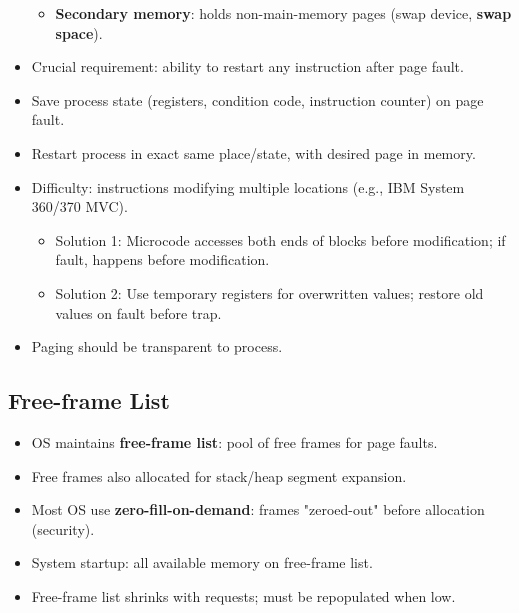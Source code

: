 \begin{itemize}
\begin{itemize}
        \item \textbf{Secondary memory}: holds non-main-memory pages (swap device, \textbf{swap space}).
    \end{itemize}
    \item Crucial requirement: ability to restart any instruction after page fault.
    \item Save process state (registers, condition code, instruction counter) on page fault.
    \item Restart process in exact same place/state, with desired page in memory.
    \item Difficulty: instructions modifying multiple locations (e.g., IBM System 360/370 MVC).
    \begin{itemize}
        \item Solution 1: Microcode accesses both ends of blocks before modification; if fault, happens before modification.
        \item Solution 2: Use temporary registers for overwritten values; restore old values on fault before trap.
    \end{itemize}
    \item Paging should be transparent to process.
\end{itemize}

\subsection{Free-frame List}
\begin{itemize}
    \item OS maintains \textbf{free-frame list}: pool of free frames for page faults.
    \item Free frames also allocated for stack/heap segment expansion.
    \item Most OS use \textbf{zero-fill-on-demand}: frames "zeroed-out" before allocation (security).
    \item System startup: all available memory on free-frame list.
    \item Free-frame list shrinks with requests; must be repopulated when low.
\end{itemize}

